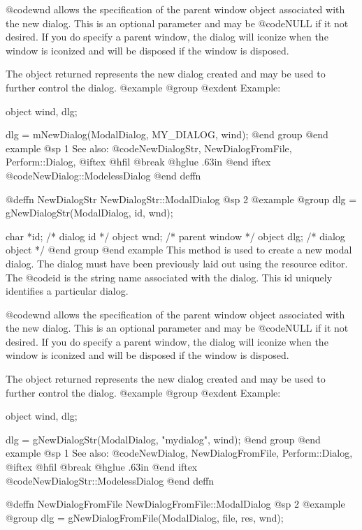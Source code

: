 @code{wnd} allows the specification of the parent window object associated
with the new dialog.  This is an optional parameter and may be @code{NULL}
if it not desired.  If you do specify a parent window, the dialog will
iconize when the window is iconized and will be disposed if the window
is disposed.

The object returned represents the new dialog created and may be
used to further control the dialog.
@example
@group
@exdent Example:

object  wind, dlg;

dlg = mNewDialog(ModalDialog, MY_DIALOG, wind);
@end group
@end example
@sp 1
See also:  @code{NewDialogStr, NewDialogFromFile, Perform::Dialog,}
@iftex
@hfil @break @hglue .63in
@end iftex
@code{NewDialog::ModelessDialog}
@end deffn










@deffn {NewDialogStr} NewDialogStr::ModalDialog
@sp 2
@example
@group
dlg = gNewDialogStr(ModalDialog, id, wnd);

char      *id;  /*  dialog id      */
object    wnd;  /*  parent window  */
object    dlg;  /*  dialog object  */
@end group
@end example
This method is used to create a new modal dialog.  The dialog must have
been previously laid out using the resource editor.  The @code{id} is
the string name associated with the dialog.  This id uniquely identifies
a particular dialog.

@code{wnd} allows the specification of the parent window object associated
with the new dialog.  This is an optional parameter and may be @code{NULL}
if it not desired.  If you do specify a parent window, the dialog will
iconize when the window is iconized and will be disposed if the window
is disposed.

The object returned represents the new dialog created and may be
used to further control the dialog.
@example
@group
@exdent Example:

object  wind, dlg;

dlg = gNewDialogStr(ModalDialog, "mydialog", wind);
@end group
@end example
@sp 1
See also:  @code{NewDialog, NewDialogFromFile, Perform::Dialog,}
@iftex
@hfil @break @hglue .63in
@end iftex
@code{NewDialogStr::ModelessDialog}
@end deffn




@deffn {NewDialogFromFile} NewDialogFromFile::ModalDialog
@sp 2
@example
@group
dlg = gNewDialogFromFile(ModalDialog, file, res, wnd);

